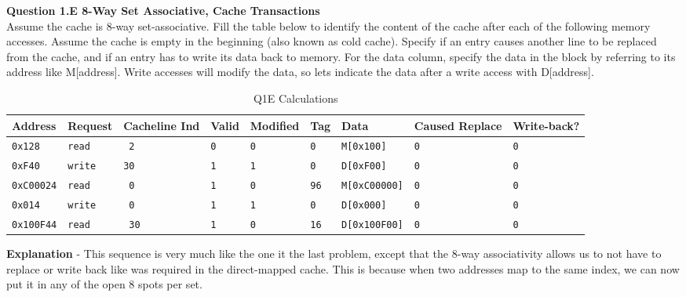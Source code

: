 \documentclass[a4paper,11pt]{article}
\newcommand{\T}{\texttt}
\begin{document}
\item \textbf{Question 1.E 8-Way Set Associative, Cache Transactions } \\
Assume the cache is 8-way set-associative. Fill the table below to identify the content of the cache after each of the following memory accesses. Assume the cache is empty in the beginning (also known as cold cache). Specify if an entry causes another line to be replaced from the cache, and if an entry has to write its data back to memory. For the data column, specify the data in the block by referring to its address like M[address]. Write accesses will modify the data, so lets indicate the data after a write access with D[address].

\begin{table}[H]
\caption{Q1E Calculations} \label{tab:q1calc2} 
\begin{center}
\begin{tabular}{| l | l | l | l | l | l | l | l | l |}
\hline
Address       & Request    & Cacheline Ind & Valid  & Modified  & Tag    & Data            & Caused Replace  & Write-back?    \\ \hline
\T{0x128}     &  \T{read}  & \T{ 2 }       & \T{0}  & \T{0}     & \T{0}  & \T{M[0x100]}    &      \T{0}      & \T{0}    \\ \hline
\T{0xF40}     &  \T{write} & \T{30 }       & \T{1}  & \T{1}     & \T{0}  & \T{D[0xF00]}    &      \T{0}      & \T{0}    \\ \hline
\T{0xC00024}  &  \T{read}  & \T{ 0 }       & \T{1}  & \T{0}     & \T{96} & \T{M[0xC00000]} &      \T{0}      & \T{0}    \\ \hline
\T{0x014}     &  \T{write} & \T{ 0 }       & \T{1}  & \T{1}     & \T{0}  & \T{D[0x000]}    &      \T{0}      & \T{0}    \\ \hline
\T{0x100F44}  &  \T{read}  & \T{ 30}       & \T{1}  & \T{0}     & \T{16} & \T{D[0x100F00]} &      \T{0}      & \T{0}    \\ \hline
\end{tabular}
\end{center}
\end{table}

\textbf{Explanation} - This sequence is very much like the one it the last problem, except that the 8-way associativity allows us to not have to replace or write back like was required in the direct-mapped cache. This is because when two addresses map to the same index, we can now put it in any of the open 8 spots per set. \\
\end{document}
